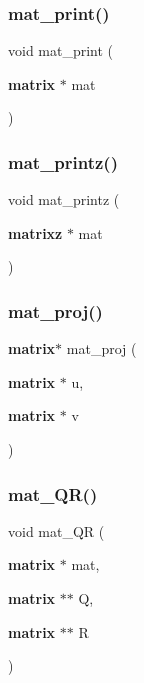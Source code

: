 \mbox{\label{mat_lib_8h_ae7762e92383201da389284af011a2df6}} 
\subsubsection{mat\+\_\+print()}
{\footnotesize\ttfamily void mat\+\_\+print (\begin{DoxyParamCaption}\item[{\textbf{ matrix} $\ast$}]{mat }\end{DoxyParamCaption})}

\mbox{\label{mat_lib_8h_a54c3d431e91ad1b8ab57580cb92aa484}} 
\subsubsection{mat\+\_\+printz()}
{\footnotesize\ttfamily void mat\+\_\+printz (\begin{DoxyParamCaption}\item[{\textbf{ matrixz} $\ast$}]{mat }\end{DoxyParamCaption})}

\mbox{\label{mat_lib_8h_a6855aaf50e486c9508069a452d5e831d}} 
\subsubsection{mat\+\_\+proj()}
{\footnotesize\ttfamily \textbf{ matrix}$\ast$ mat\+\_\+proj (\begin{DoxyParamCaption}\item[{\textbf{ matrix} $\ast$}]{u,  }\item[{\textbf{ matrix} $\ast$}]{v }\end{DoxyParamCaption})}

\mbox{\label{mat_lib_8h_a6c269e6e0e207ba3d4c1f6f84f748f57}} 
\subsubsection{mat\+\_\+\+Q\+R()}
{\footnotesize\ttfamily void mat\+\_\+\+QR (\begin{DoxyParamCaption}\item[{\textbf{ matrix} $\ast$}]{mat,  }\item[{\textbf{ matrix} $\ast$$\ast$}]{Q,  }\item[{\textbf{ matrix} $\ast$$\ast$}]{R }\end{DoxyParamCaption})}

